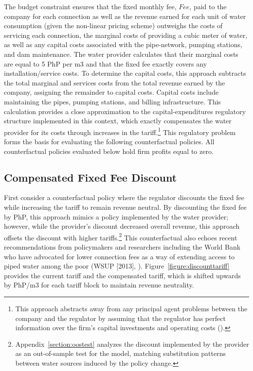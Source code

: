\documentclass[12pt]{article}
\begin{document}
The budget constraint ensures that the fixed monthly fee, $Fee$, paid to the company for each connection as well as the revenue earned for each unit of water consumption (given the non-linear pricing scheme) outweighs the costs of servicing each connection, the marginal costs of providing a cubic meter of water, as well as any capital costs associated with the pipe-network, pumping stations, and dam maintenance.  The water provider calculates that their marginal costs are equal to 5 PhP per m3 and that the fixed fee exactly covers any installation/service costs.  To determine the capital costs, this approach subtracts the total marginal and services costs from the total revenue earned by the company, assigning the remainder to capital costs.  Capital costs include maintaining the pipes, pumping stations, and billing infrastructure.  This calculation provides a close approximation to the capital-expenditures regulatory structure implemented in this context, which exactly compensates the water provider for its costs through increases in the tariff.\footnote{This approach abstracts away from any principal agent problems between the company and the regulator by assuming that the regulator has perfect information over the firm's capital investments and operating costs (\cite{laffont1993theory}).}  This regulatory problem forms the basis for evaluating the following counterfactual policies.  All counterfactual policies evaluated below hold firm profits equal to zero.


\subsection{Compensated Fixed Fee Discount}

First consider a counterfactual policy where the regulator discounts the fixed fee while increasing the tariff to remain revenue neutral.  By discounting the fixed fee by PhP, this approach mimics a policy implemented by the water provider; however, while the provider's discount decreased overall revenue, this approach offsets the discount with higher tariffs.\footnote{Appendix~\ref{section:oostest} analyzes the discount implemented by the provider as an out-of-sample test for the model, matching substitution patterns between water sources induced by the policy change.}  This counterfactual also echoes recent recommendations from policymakers and researchers including the World Bank who have advocated for lower connection fees as a way of extending access to piped water among the poor (WSUP [2013], \cite{komives2005water,jimenez2014factors,kayaga2007costs,mcintosh2003asian}).  Figure~\ref{figure:discounttariff} provides the current tariff and the compensated tariff, which is shifted upwards by PhP/m3 for each tariff block to maintain revenue neutrality.  
\end{document}
